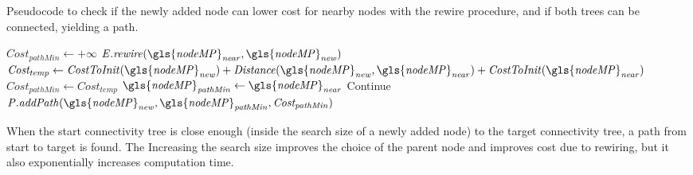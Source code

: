 \begin{algorithm}[H]
\caption{Pseudocode to check if the newly added node can lower cost for nearby nodes with the rewire procedure, and if both trees can be connected, yielding a path.}%
\label{pseudocode:proposed_rrt_star_three}
\begin{algorithmic}[1]
\hspace{-0.9cm}\colorbox{my_green}{\parbox{\linewidth}{%
    \State $\mathit{Cost_{pathMin}} \leftarrow +\infty$
    \State $\mathit{E.rewire(\gls{nodeMP}_{near}, \gls{nodeMP}_{new})}$
        \EndIf
      \Else {}
      \State $\mathit{Cost_{temp} \leftarrow CostToInit(\gls{nodeMP}_{new}) + Distance(\gls{nodeMP}_{new}, \gls{nodeMP}_{near})} + \mathit{CostToInit(\gls{nodeMP}_{near})}$
          \State $\mathit{Cost_{pathMin} \leftarrow \mathit{Cost}_{temp}}$
          \State $\mathit{\gls{nodeMP}_{pathMin} \leftarrow \gls{nodeMP}_{near}}$
          \EndIf
      \EndIf
          \State Continue
      \Else
      \State $\mathit{P.addPath(\gls{nodeMP}_{new}, \gls{nodeMP}_{pathMin}, Cost_{pathMin})}$
      \EndIf
    \EndFor
}}
\end{algorithmic}
\end{algorithm}

When the start connectivity tree is close enough (inside the search size of a newly added node) to the target connectivity tree, a path from start to target is found. The  
Increasing the search size improves the choice of the parent node and improves cost due to rewiring, but it also exponentially increases computation time.


